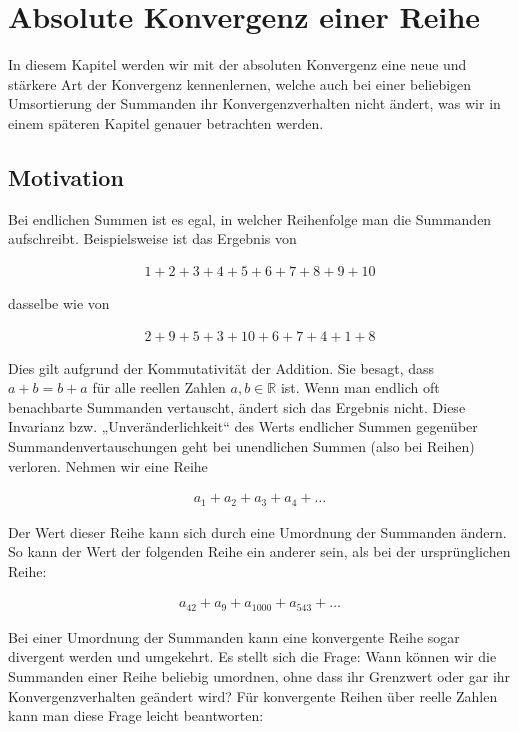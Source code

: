 \documentclass[fontsize=9pt,
               parskip=half-,
               DIV=14,
               listof=chapterentry,
               tocflat]{scrbook}
\begin{document}
\chapter{Absolute Konvergenz einer Reihe}

In diesem Kapitel werden wir mit der absoluten Konvergenz eine neue und stärkere Art der Konvergenz kennenlernen, welche auch bei einer beliebigen Umsortierung der Summanden ihr Konvergenzverhalten nicht ändert, was wir in einem späteren Kapitel genauer betrachten werden.

\section{Motivation}

Bei endlichen Summen ist es egal, in welcher Reihenfolge man die Summanden aufschreibt. Beispielsweise ist das Ergebnis von

\begin{align*}
1+2+3+4+5+6+7+8+9+10
\end{align*}

dasselbe wie von

\begin{align*}
2+9+5+3+10+6+7+4+1+8
\end{align*}

Dies gilt aufgrund der Kommutativität der Addition. Sie besagt, dass $a+b=b+a$ für alle reellen Zahlen $a,b\in \mathbb {R} $ ist. Wenn man endlich oft benachbarte Summanden vertauscht, ändert sich das Ergebnis nicht. Diese Invarianz bzw. „Unveränderlichkeit“ des Werts endlicher Summen gegenüber Summandenvertauschungen geht bei unendlichen Summen (also bei Reihen) verloren. Nehmen wir eine Reihe

\begin{align*}
a_{1}+a_{2}+a_{3}+a_{4}+\ldots 
\end{align*}

Der Wert dieser Reihe kann sich durch eine Umordnung der Summanden ändern. So kann der Wert der folgenden Reihe ein anderer sein, als bei der ursprünglichen Reihe:

\begin{align*}
a_{42}+a_{9}+a_{1000}+a_{543}+\ldots 
\end{align*}

Bei einer Umordnung der Summanden kann eine konvergente Reihe sogar divergent werden und umgekehrt. Es stellt sich die Frage: Wann können wir die Summanden einer Reihe beliebig umordnen, ohne dass ihr Grenzwert oder gar ihr Konvergenzverhalten geändert wird? Für konvergente Reihen über reelle Zahlen kann man diese Frage leicht beantworten:
\end{document}
